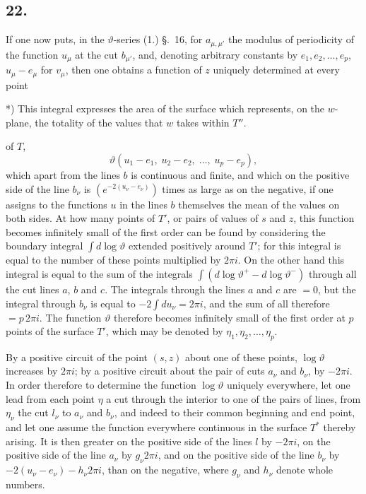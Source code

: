 \documentclass{article}
\begin{document}
\subsection*{22.}

If one now puts, in the $\vartheta$-series (1.) §.~16, for $a_{\mu,\mu'}$ the modulus of periodicity of the function $u_{\mu}$ at the cut $b_{\mu'}$, and, denoting arbitrary constants by $e_{1}, e_{2}, \ldots, e_{p}$, $u_{\mu} - e_{\mu}$ for $v_{\mu}$, then one obtains a function of $z$ uniquely determined at every point

*) This integral expresses the area of the surface which represents, on the $w$-plane, the totality of the values that $w$ takes within $T''$.

of $T$,
\[ \vartheta(u_{1}-e_{1}, \; u_{2}-e_{2}, \; \ldots, \; u_{p}-e_{p}), \]
which apart from the lines $b$ is continuous and finite, and which on the positive side of the line $b_{\nu}$ is $\left(e^{-2(u_{\nu}-e_{\nu})}\right)$ times as large as on the negative, if one assigns to the functions $u$ in the lines $b$ themselves the mean of the values on both sides. At how many points of $T'$, or pairs of values of $s$ and $z$, this function becomes infinitely small of the first order can be found by considering the boundary integral $\displaystyle\int d\log\vartheta$ extended positively around $T'$; for this integral is equal to the number of these points multiplied by $2\pi i$. On the other hand this integral is equal to the sum of the integrals $\displaystyle\int (d\log\vartheta^{+} - d\log\vartheta^{-})$ through all the cut lines $a$, $b$ and $c$. The integrals through the lines $a$ and $c$ are $= 0$, but the integral through $b_{\nu}$ is equal to $-2\displaystyle\int du_{\nu} = 2\pi i$, and the sum of all therefore $= p\,2\pi i$. The function $\vartheta$ therefore becomes infinitely small of the first order at $p$ points of the surface $T'$, which may be denoted by $\eta_{1}, \eta_{2}, \ldots, \eta_{p}$.

By a positive circuit of the point $(s, z)$ about one of these points, $\log\vartheta$ increases by $2\pi i$; by a positive circuit about the pair of cuts $a_{\nu}$ and $b_{\nu}$, by $-2\pi i$. In order therefore to determine the function $\log\vartheta$ uniquely everywhere, let one lead from each point $\eta$ a cut through the interior to one of the pairs of lines, from $\eta_{\nu}$ the cut $l_{\nu}$ to $a_{\nu}$ and $b_{\nu}$, and indeed to their common beginning and end point, and let one assume the function everywhere continuous in the surface $T^{*}$ thereby arising. It is then greater on the positive side of the lines $l$ by $-2\pi i$, on the positive side of the line $a_{\nu}$ by $g_{\nu} 2\pi i$, and on the positive side of the line $b_{\nu}$ by $-2(u_{\nu}-e_{\nu}) - h_{\nu} 2\pi i$, than on the negative, where $g_{\nu}$ and $h_{\nu}$ denote whole numbers.
\end{document}

